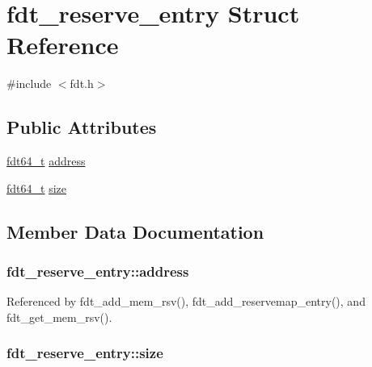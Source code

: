\hypertarget{structfdt__reserve__entry}{\section{fdt\-\_\-reserve\-\_\-entry Struct Reference}
\label{structfdt__reserve__entry}
}


{\ttfamily \#include $<$fdt.\-h$>$}

\subsection*{Public Attributes}
\begin{DoxyCompactItemize}
\item 
\hyperlink{libfdt__env_8h_ace50a73711239df43c98cc1d5fedd1f8}{fdt64\-\_\-t} \hyperlink{structfdt__reserve__entry_a1453319ff97e2d7c2ec0762cee56e98e}{address}
\item 
\hyperlink{libfdt__env_8h_ace50a73711239df43c98cc1d5fedd1f8}{fdt64\-\_\-t} \hyperlink{structfdt__reserve__entry_ace12399f157bc46877fbcddec98da67e}{size}
\end{DoxyCompactItemize}


\subsection{Member Data Documentation}
\hypertarget{structfdt__reserve__entry_a1453319ff97e2d7c2ec0762cee56e98e}{
\subsubsection[{address}]{ fdt\-\_\-reserve\-\_\-entry\-::address}}\label{structfdt__reserve__entry_a1453319ff97e2d7c2ec0762cee56e98e}


Referenced by fdt\-\_\-add\-\_\-mem\-\_\-rsv(), fdt\-\_\-add\-\_\-reservemap\-\_\-entry(), and fdt\-\_\-get\-\_\-mem\-\_\-rsv().

\hypertarget{structfdt__reserve__entry_ace12399f157bc46877fbcddec98da67e}{
\subsubsection[{size}]{ fdt\-\_\-reserve\-\_\-entry\-::size}}\label{structfdt__reserve__entry_ace12399f157bc46877fbcddec98da67e}


